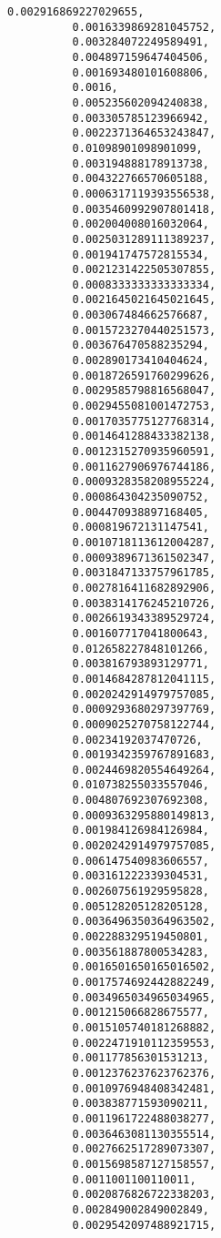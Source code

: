 \documentclass[11pt]{article}
\begin{document}
\begin{Verbatim}[commandchars=\\\{\}]
          0.002916869227029655,
          0.0016339869281045752,
          0.003284072249589491,
          0.004897159647404506,
          0.001693480101608806,
          0.0016,
          0.005235602094240838,
          0.003305785123966942,
          0.0022371364653243847,
          0.01098901098901099,
          0.003194888178913738,
          0.004322766570605188,
          0.0006317119393556538,
          0.0035460992907801418,
          0.002004008016032064,
          0.0025031289111389237,
          0.001941747572815534,
          0.0021231422505307855,
          0.0008333333333333334,
          0.0021645021645021645,
          0.003067484662576687,
          0.0015723270440251573,
          0.003676470588235294,
          0.002890173410404624,
          0.0018726591760299626,
          0.0029585798816568047,
          0.0029455081001472753,
          0.0017035775127768314,
          0.0014641288433382138,
          0.0012315270935960591,
          0.0011627906976744186,
          0.0009328358208955224,
          0.000864304235090752,
          0.004470938897168405,
          0.000819672131147541,
          0.0010718113612004287,
          0.0009389671361502347,
          0.0031847133757961785,
          0.0027816411682892906,
          0.0038314176245210726,
          0.0026619343389529724,
          0.001607717041800643,
          0.012658227848101266,
          0.003816793893129771,
          0.0014684287812041115,
          0.0020242914979757085,
          0.0009293680297397769,
          0.0009025270758122744,
          0.00234192037470726,
          0.0019342359767891683,
          0.0024469820554649264,
          0.010738255033557046,
          0.004807692307692308,
          0.0009363295880149813,
          0.001984126984126984,
          0.0020242914979757085,
          0.006147540983606557,
          0.003161222339304531,
          0.002607561929595828,
          0.005128205128205128,
          0.0036496350364963502,
          0.002288329519450801,
          0.003561887800534283,
          0.0016501650165016502,
          0.0017574692442882249,
          0.0034965034965034965,
          0.001215066828675577,
          0.0015105740181268882,
          0.0022471910112359553,
          0.001177856301531213,
          0.0012376237623762376,
          0.0010976948408342481,
          0.003838771593090211,
          0.0011961722488038277,
          0.0036463081130355514,
          0.0027662517289073307,
          0.0015698587127158557,
          0.0011001100110011,
          0.0020876826722338203,
          0.002849002849002849,
          0.0029542097488921715,

\end{Verbatim}
\end{document}
